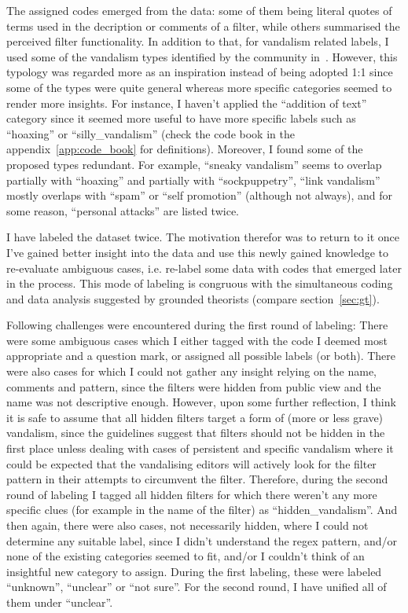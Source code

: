 The assigned codes emerged from the data: some of them being literal quotes of terms used in the decription or comments of a filter, while others summarised the perceived filter functionality.
In addition to that, for vandalism related labels, I used some of the vandalism types identified by the community in~\cite{Wikipedia:VandalismTypes}.
However, this typology was regarded more as an inspiration instead of being adopted 1:1 since some of the types were quite general whereas more specific categories seemed to render more insights.
For instance, I haven't applied the ``addition of text'' category since it seemed more useful to have more specific labels such as ``hoaxing'' or ``silly\_vandalism'' (check the code book in the appendix~\ref{app:code_book} for definitions).
Moreover, I found some of the proposed types redundant.
For example, ``sneaky vandalism'' seems to overlap partially with ``hoaxing'' and partially with ``sockpuppetry'', ``link vandalism'' mostly overlaps with ``spam'' or ``self promotion'' (although not always), and for some reason, ``personal attacks'' are listed twice.

I have labeled the dataset twice.
The motivation therefor was to return to it once I've gained better insight into the data and use this newly gained knowledge to re-evaluate ambiguous cases, i.e. re-label some data with codes that emerged later in the process.
This mode of labeling is congruous with the simultaneous coding and data analysis suggested by grounded theorists (compare section~\ref{sec:gt}).

Following challenges were encountered during the first round of labeling:
There were some ambiguous cases which I either tagged with the code I deemed most appropriate and a question mark, or assigned all possible labels (or both).
There were also cases for which I could not gather any insight relying on the name, comments and pattern, since the filters were hidden from public view and the name was not descriptive enough.
However, upon some further reflection, I think it is safe to assume that all hidden filters target a form of (more or less grave) vandalism, since the guidelines suggest that filters should not be hidden in the first place unless dealing with cases of persistent and specific vandalism where it could be expected that the vandalising editors will actively look for the filter pattern in their attempts to circumvent the filter\cite{Wikipedia:EditFilter}.
Therefore, during the second round of labeling I tagged all hidden filters for which there weren't any more specific clues (for example in the name of the filter) as ``hidden\_vandalism''.
And then again, there were also cases, not necessarily hidden, where I could not determine any suitable label, since I didn't understand the regex pattern, and/or none of the existing categories seemed to fit, and/or I couldn't think of an insightful new category to assign.
During the first labeling, these were labeled ``unknown'', ``unclear'' or ``not sure''.
For the second round, I have unified all of them under ``unclear''.

